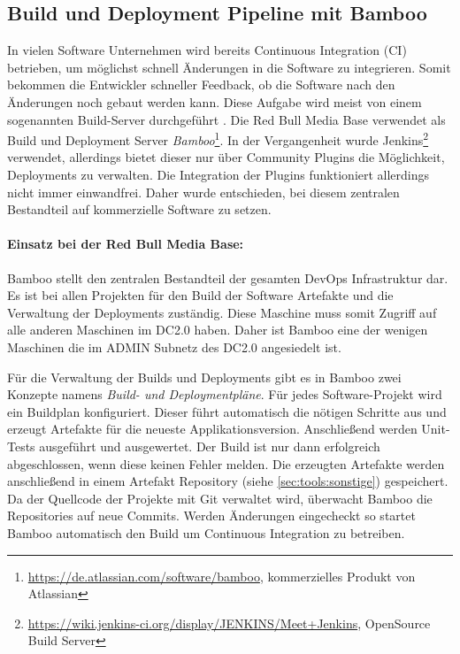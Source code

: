 \subsection{Build und Deployment Pipeline mit Bamboo}
\label{sec:pipeline}
In vielen Software Unternehmen wird bereits Continuous Integration (CI) betrieben, um möglichst schnell Änderungen in die Software zu integrieren. Somit bekommen die Entwickler schneller Feedback, ob die Software nach den Änderungen noch gebaut werden kann. Diese Aufgabe wird meist von einem sogenannten Build-Server durchgeführt \cite{wolff2014}. Die Red Bull Media Base verwendet als Build und Deployment Server \textit{Bamboo}\footnote{\url{https://de.atlassian.com/software/bamboo}, kommerzielles Produkt von Atlassian}. In der Vergangenheit wurde Jenkins\footnote{\url{https://wiki.jenkins-ci.org/display/JENKINS/Meet+Jenkins}, OpenSource Build Server} verwendet, allerdings bietet dieser nur über Community Plugins die Möglichkeit, Deployments zu verwalten. Die Integration der Plugins funktioniert allerdings nicht immer einwandfrei. Daher wurde entschieden, bei diesem zentralen Bestandteil auf kommerzielle Software zu setzen. 

\paragraph{Einsatz bei der Red Bull Media Base:} Bamboo stellt den zentralen Bestandteil der gesamten DevOps Infrastruktur dar. Es ist bei allen Projekten für den Build der Software Artefakte und die Verwaltung der Deployments zuständig. Diese Maschine muss somit Zugriff auf alle anderen Maschinen im DC2.0 haben. Daher ist Bamboo eine der wenigen Maschinen die im ADMIN Subnetz des DC2.0 angesiedelt ist.

Für die Verwaltung der Builds und Deployments gibt es in Bamboo zwei Konzepte namens \textit{Build- und Deploymentpläne}. Für jedes Software-Projekt wird ein Buildplan konfiguriert. Dieser führt automatisch die nötigen Schritte aus und erzeugt Artefakte für die neueste Applikationsversion. Anschließend werden Unit-Tests ausgeführt und ausgewertet. Der Build ist nur dann erfolgreich abgeschlossen, wenn diese keinen Fehler melden. Die erzeugten Artefakte werden anschließend in einem Artefakt Repository (siehe \ref{sec:tools:sonstige}) gespeichert. 
Da der Quellcode der Projekte mit Git verwaltet wird, überwacht Bamboo die Repositories auf neue Commits. Werden Änderungen eingecheckt so startet Bamboo automatisch den Build um Continuous Integration zu betreiben.


